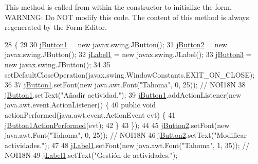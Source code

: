 This method is called from within the constructor to initialize the form. W\+A\+R\+N\+I\+NG\+: Do N\+OT modify this code. The content of this method is always regenerated by the Form Editor. 
\begin{DoxyCode}
28                                   \{
29 
30         \mbox{\hyperlink{classsoftware_1_1parasoftware2_a4378147bbe05c9a06d9a8b7193295dbb}{jButton1}} = \textcolor{keyword}{new} javax.swing.JButton();
31         \mbox{\hyperlink{classsoftware_1_1parasoftware2_abaa75d46f51c45dbab64b7bb44e560f0}{jButton2}} = \textcolor{keyword}{new} javax.swing.JButton();
32         \mbox{\hyperlink{classsoftware_1_1parasoftware2_ac0a23aafed6d2dcc193ca1c7cd0c65f7}{jLabel1}} = \textcolor{keyword}{new} javax.swing.JLabel();
33         \mbox{\hyperlink{classsoftware_1_1parasoftware2_a32aae8d275502c425e0804761777d920}{jButton3}} = \textcolor{keyword}{new} javax.swing.JButton();
34 
35         setDefaultCloseOperation(javax.swing.WindowConstants.EXIT\_ON\_CLOSE);
36 
37         \mbox{\hyperlink{classsoftware_1_1parasoftware2_a4378147bbe05c9a06d9a8b7193295dbb}{jButton1}}.setFont(\textcolor{keyword}{new} java.awt.Font(\textcolor{stringliteral}{"Tahoma"}, 0, 25)); \textcolor{comment}{// NOI18N}
38         \mbox{\hyperlink{classsoftware_1_1parasoftware2_a4378147bbe05c9a06d9a8b7193295dbb}{jButton1}}.setText(\textcolor{stringliteral}{"Añadir actividad."});
39         \mbox{\hyperlink{classsoftware_1_1parasoftware2_a4378147bbe05c9a06d9a8b7193295dbb}{jButton1}}.addActionListener(\textcolor{keyword}{new} java.awt.event.ActionListener() \{
40             \textcolor{keyword}{public} \textcolor{keywordtype}{void} actionPerformed(java.awt.event.ActionEvent evt) \{
41                 \mbox{\hyperlink{classsoftware_1_1parasoftware2_a2f1d046687f61a8eed6ee6109bacaa07}{jButton1ActionPerformed}}(evt);
42             \}
43         \});
44 
45         \mbox{\hyperlink{classsoftware_1_1parasoftware2_abaa75d46f51c45dbab64b7bb44e560f0}{jButton2}}.setFont(\textcolor{keyword}{new} java.awt.Font(\textcolor{stringliteral}{"Tahoma"}, 0, 25)); \textcolor{comment}{// NOI18N}
46         \mbox{\hyperlink{classsoftware_1_1parasoftware2_abaa75d46f51c45dbab64b7bb44e560f0}{jButton2}}.setText(\textcolor{stringliteral}{"Modificar actividades."});
47 
48         \mbox{\hyperlink{classsoftware_1_1parasoftware2_ac0a23aafed6d2dcc193ca1c7cd0c65f7}{jLabel1}}.setFont(\textcolor{keyword}{new} java.awt.Font(\textcolor{stringliteral}{"Tahoma"}, 1, 35)); \textcolor{comment}{// NOI18N}
49         \mbox{\hyperlink{classsoftware_1_1parasoftware2_ac0a23aafed6d2dcc193ca1c7cd0c65f7}{jLabel1}}.setText(\textcolor{stringliteral}{"Gestión de actividades."});

\end{DoxyCode}
